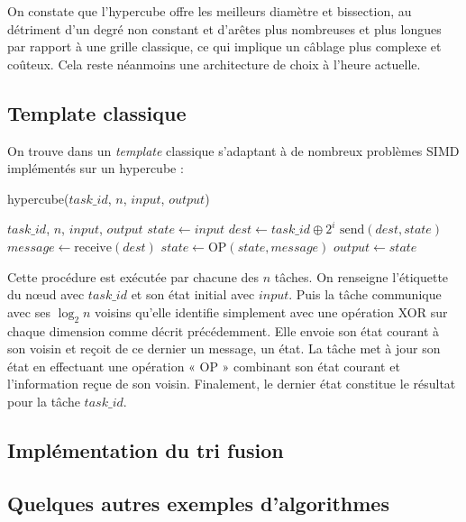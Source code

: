 On constate que l'hypercube offre les meilleurs diamètre et bissection, au détriment d'un degré non constant et d'arêtes plus nombreuses et plus longues par rapport à une grille classique, ce qui implique un câblage plus complexe et coûteux. Cela reste néanmoins une architecture de choix à l'heure actuelle.

\subsection{Template classique}

On trouve dans \cite{FOSTER} un \textit{template} classique s'adaptant à de nombreux problèmes SIMD implémentés sur un hypercube :

\begin{algorithm}
\caption{hypercube($task\_id$, $n$, $input$, $output$)}
\begin{algorithmic}
\REQUIRE $task\_id$, $n$, $input$, $output$
\STATE $state \leftarrow input$
\STATE $dest \leftarrow task\_id \oplus 2^i$
\STATE $\text{send}(dest, state)$
\STATE $message \leftarrow \text{receive}(dest)$
\STATE $state \leftarrow \text{OP}(state, message)$
\ENDFOR
\STATE $output \leftarrow state$
\end{algorithmic}
\end{algorithm}

Cette procédure est exécutée par chacune des $n$ tâches. On renseigne l'étiquette du nœud avec $task\_id$ et son état initial avec $input$. Puis la tâche communique avec ses $\log_2 n$ voisins qu'elle identifie simplement avec une opération XOR sur chaque dimension comme décrit précédemment. Elle envoie son état courant à son voisin et reçoit de ce dernier un message, un état. La tâche met à jour son état en effectuant une opération « OP » combinant son état courant et l'information reçue de son voisin. Finalement, le dernier état constitue le résultat pour la tâche $task\_id$.

\subsection{Implémentation du tri fusion}


\subsection{Quelques autres exemples d'algorithmes}